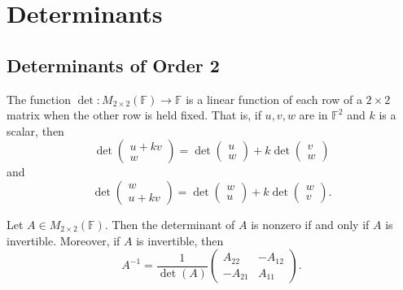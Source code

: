 \section{Determinants}
\subsection{Determinants of Order 2}
\begin{theorem}
    The function \(\det: M_{2 \times 2}(\mathbb{F}) \to \mathbb{F}\) is a linear function of each row of a \(2 \times 2\) matrix when the other row is held fixed. That is, if \(u, v, w\) are in \(\mathbb{F}^2\) and \(k\) is a scalar, then
    \[
    \det \begin{pmatrix} u + kv \\ w \end{pmatrix}
    = \det \begin{pmatrix} u \\ w \end{pmatrix} + k \det \begin{pmatrix} v \\ w \end{pmatrix}
    \]
    and
    \[
    \det \begin{pmatrix} w \\ u + kv \end{pmatrix}
    = \det \begin{pmatrix} w \\ u \end{pmatrix} + k \det \begin{pmatrix} w \\ v \end{pmatrix}.
    \]
\end{theorem}
\vspace{2cm}
\begin{theorem}
    Let \(A \in M_{2 \times 2}(\mathbb{F})\). Then the determinant of \(A\) is nonzero if and only if \(A\) is invertible. Moreover, if \(A\) is invertible, then
    \[
    A^{-1} = \frac{1}{\det(A)} 
    \begin{pmatrix}
        A_{22} & -A_{12} \\
        -A_{21} & A_{11}
    \end{pmatrix}.
    \]
\end{theorem}
\newpage
